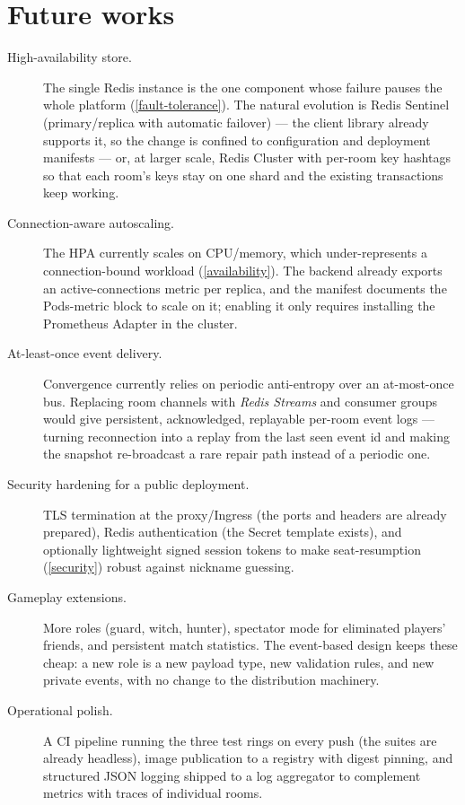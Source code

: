 \documentclass{scrartcl}
\begin{document}

\section{Future works}\label{future-works}

\begin{description}
  \item[High-availability store.] The single Redis instance is the one
  component whose failure pauses the whole platform
  (\cref{fault-tolerance}). The natural evolution is Redis Sentinel
  (primary/replica with automatic failover) --- the client library already
  supports it, so the change is confined to configuration and deployment
  manifests --- or, at larger scale, Redis Cluster with per-room key
  hashtags so that each room's keys stay on one shard and the existing
  transactions keep working.

  \item[Connection-aware autoscaling.] The HPA currently scales on
  CPU/memory, which under-represents a connection-bound workload
  (\cref{availability}). The backend already exports an
  active-connections metric per replica, and the manifest documents the
  Pods-metric block to scale on it; enabling it only requires installing
  the Prometheus Adapter in the cluster.

  \item[At-least-once event delivery.] Convergence currently relies on
  periodic anti-entropy over an at-most-once bus. Replacing room
  channels with \emph{Redis Streams} and consumer groups would give
  persistent, acknowledged, replayable per-room event logs --- turning
  reconnection into a replay from the last seen event id and making the
  snapshot re-broadcast a rare repair path instead of a periodic one.

  \item[Security hardening for a public deployment.] TLS termination at
  the proxy/Ingress (the ports and headers are already prepared),
  Redis authentication (the Secret template exists), and optionally
  lightweight signed session tokens to make seat-resumption
  (\cref{security}) robust against nickname guessing.

  \item[Gameplay extensions.] More roles (guard, witch, hunter),
  spectator mode for eliminated players' friends, and persistent match
  statistics. The event-based design keeps these cheap: a new role is a
  new payload type, new validation rules, and new private events, with
  no change to the distribution machinery.

  \item[Operational polish.] A CI pipeline running the three test rings
  on every push (the suites are already headless), image publication to
  a registry with digest pinning, and structured JSON logging shipped to
  a log aggregator to complement metrics with traces of individual
  rooms.
\end{description}



\end{document}
